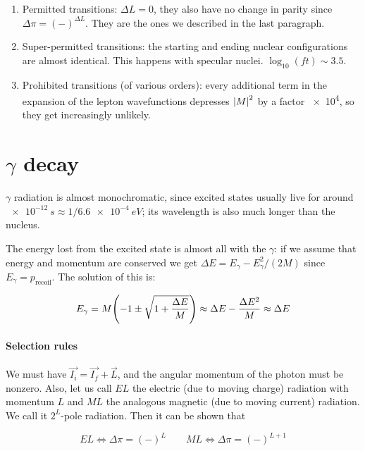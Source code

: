 \documentclass{article}
\begin{document}
\begin{enumerate}
    \item Permitted transitions: \(\Delta L =0\), they also have no change in parity since \(\Delta \pi = (-)^{\Delta L}\). They are the ones we described in the last paragraph.
    \item Super-permitted transitions: the starting and ending nuclear configurations are almost identical. This happens with specular nuclei. \(\log_{10}(ft) \sim 3.5 \).
    \item Prohibited transitions (of various orders): every additional term in the expansion of the lepton wavefunctions depresses \(\abs{M}^{2} \) by a factor \SI{e4}{}, so they get increasingly unlikely.
\end{enumerate}

\section{\(\gamma \) decay}

\(\gamma\) radiation is almost monochromatic, since excited states usually live for around \(\SI{e-12}{s} \approx 1/ \SI{6.6e-4}{eV} \); its wavelength is also much longer than the nucleus.

The energy lost from the excited state is almost all with the \(\gamma\): if we assume that energy and momentum are conserved we get \(\Delta E = E_\gamma - E_\gamma^2 / (2M)\) since \(E_\gamma = p_{\text{recoil}}\). The solution of this is:

\begin{equation}
    E_\gamma = M \qty(-1 \pm \sqrt{1+ \frac{\Delta E}{M}} ) \approx \Delta E - \frac{\Delta E ^2}{M} \approx \Delta E
\end{equation}

\paragraph{Selection rules}

We must have \(\vec{I_i} = \vec{I_f} + \vec{L} \), and the angular momentum of the photon must be nonzero. Also, let us call \(EL\) the electric (due to moving charge) radiation with momentum \(L\) and \(ML\) the analogous magnetic (due to moving current) radiation. We call it \(2^L\)-pole radiation. Then it can be shown that

\begin{equation}
    EL \iff \Delta \pi = (-)^L \qquad
    ML \iff \Delta \pi = (-)^{L+1}
\end{equation}
\end{document}
